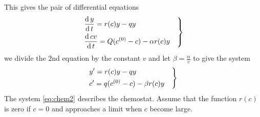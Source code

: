 \documentclass[../main-sheet.tex]{subfiles}
\begin{document}
\begin{soln}
    This gives the pair of differential equations
    \begin{equation}
        \begin{rcases}
            \displaystyle\,\frac{\mathrm{d}\,y}{\mathrm{d}\,t}=r(c)y-qy\quad\\
            \displaystyle\,\frac{\mathrm{d}\,cv}{\mathrm{d}\,t}=Q(c^{(0)}-c) -\alpha r(c)y\quad   
        \end{rcases}
        \label{eq:chem1}
    \end{equation}
    we divide the 2nd equation by the constant \(v\) and let \(\beta=\frac{\alpha}{v}\) to give the system 
    \begin{equation}
        \begin{rcases}
            \displaystyle y'=r(c)y-qy\quad\\
            \displaystyle c'=q(c^{(0)}-c) -\beta r(c)y\quad   
        \end{rcases}
        \label{eq:chem2}
    \end{equation}
    The system \eqref{eq:chem2} describes the chemostat. Assume that the function \(r(c)\) is zero if \(c=0\) and approaches a limit when \(c\) become large.
    

\end{soln}
\end{document}
